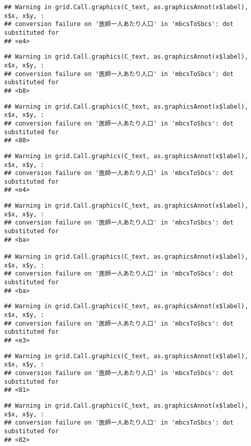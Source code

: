 \documentclass[
]{article}
\begin{document}
\begin{verbatim}
## Warning in grid.Call.graphics(C_text, as.graphicsAnnot(x$label), x$x, x$y, :
## conversion failure on '医師一人あたり人口' in 'mbcsToSbcs': dot substituted for
## <e4>
\end{verbatim}

\begin{verbatim}
## Warning in grid.Call.graphics(C_text, as.graphicsAnnot(x$label), x$x, x$y, :
## conversion failure on '医師一人あたり人口' in 'mbcsToSbcs': dot substituted for
## <b8>
\end{verbatim}

\begin{verbatim}
## Warning in grid.Call.graphics(C_text, as.graphicsAnnot(x$label), x$x, x$y, :
## conversion failure on '医師一人あたり人口' in 'mbcsToSbcs': dot substituted for
## <80>
\end{verbatim}

\begin{verbatim}
## Warning in grid.Call.graphics(C_text, as.graphicsAnnot(x$label), x$x, x$y, :
## conversion failure on '医師一人あたり人口' in 'mbcsToSbcs': dot substituted for
## <e4>
\end{verbatim}

\begin{verbatim}
## Warning in grid.Call.graphics(C_text, as.graphicsAnnot(x$label), x$x, x$y, :
## conversion failure on '医師一人あたり人口' in 'mbcsToSbcs': dot substituted for
## <ba>

## Warning in grid.Call.graphics(C_text, as.graphicsAnnot(x$label), x$x, x$y, :
## conversion failure on '医師一人あたり人口' in 'mbcsToSbcs': dot substituted for
## <ba>
\end{verbatim}

\begin{verbatim}
## Warning in grid.Call.graphics(C_text, as.graphicsAnnot(x$label), x$x, x$y, :
## conversion failure on '医師一人あたり人口' in 'mbcsToSbcs': dot substituted for
## <e3>
\end{verbatim}

\begin{verbatim}
## Warning in grid.Call.graphics(C_text, as.graphicsAnnot(x$label), x$x, x$y, :
## conversion failure on '医師一人あたり人口' in 'mbcsToSbcs': dot substituted for
## <81>
\end{verbatim}

\begin{verbatim}
## Warning in grid.Call.graphics(C_text, as.graphicsAnnot(x$label), x$x, x$y, :
## conversion failure on '医師一人あたり人口' in 'mbcsToSbcs': dot substituted for
## <82>
\end{verbatim}
\end{document}
